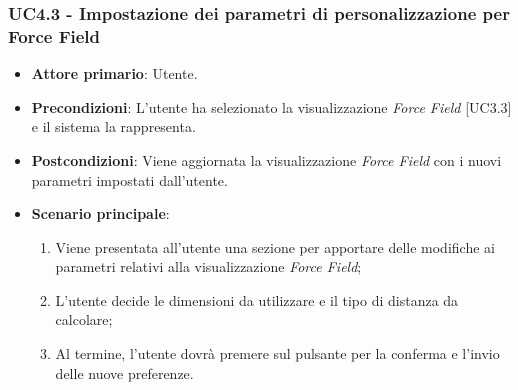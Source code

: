 \subsubsection{UC4.3 - Impostazione dei parametri di personalizzazione per Force Field}
\begin{itemize}
	\item \textbf{Attore primario}: Utente.
	\item \textbf{Precondizioni}: L'utente ha selezionato la visualizzazione \textit{Force Field} [UC3.3] e il sistema la rappresenta.
	\item \textbf{Postcondizioni}: Viene aggiornata la visualizzazione \textit{Force Field} con i nuovi parametri impostati dall'utente.
	\item \textbf{Scenario principale}:
	\begin{enumerate}
			\item Viene presentata all'utente una sezione per apportare delle modifiche ai parametri relativi alla visualizzazione \textit{Force Field};
			\item L'utente decide le dimensioni da utilizzare e il tipo di distanza da calcolare;
			\item Al termine, l'utente dovrà premere sul pulsante per la conferma e l'invio delle nuove preferenze.
		\end{enumerate}
\end{itemize}